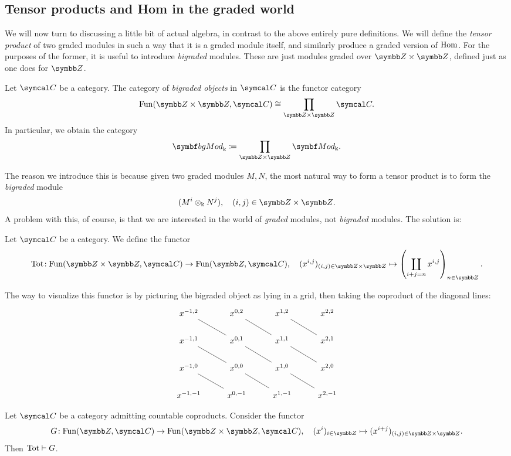 \subsection{Tensor products and Hom in the graded world}
We will now turn to discussing a little bit of actual algebra, in contrast to the above entirely pure definitions. We will define the \emph{tensor product}
of two graded modules in such a way that it is a graded module itself, and similarly produce a graded version of \(\operatorname{Hom}\). For the purposes of the former,
it is useful to introduce \emph{bigraded} modules. These are just modules graded over \(\Z\times\Z\), defined just as one does for \(\Z\).
\begin{definition}
	Let \(\calC\) be a category. The category of \emph{bigraded objects} in \(\calC\) is the functor category
	\[ \Fun(\Z\times\Z,\calC) \cong \prod_{\Z\times\Z}\calC. \]
	In particular, we obtain the category
	\[ \bgMod_{\Bbbk} \coloneq \prod_{\Z\times\Z}\Mod_{\Bbbk}. \]
\end{definition}
The reason we introduce this is because given two graded modules \(M,N\), the most natural way to form a tensor product is to form the
\emph{bigraded} module
\[ (M^i\otimes_\Bbbk N^j), \quad {(i,j)\in\Z\times\Z}. \]
A problem with this, of course, is that we are interested in the world of \emph{graded} modules, not \emph{bigraded} modules. The solution is:
\begin{definition}
	Let \(\calC\) be a category. We define the functor
	\[ \Tot\!:\Fun(\Z\times\Z,\calC)\to\Fun(\Z,\calC),\quad (x^{i,j})_{(i,j)\in\Z\times\Z} \mapsto \left(\coprod_{i+j=n}x^{i,j}\right)_{n\in\Z}.  \]
\end{definition}
The way to visualize this functor is by picturing the bigraded object as lying in a grid, then taking the coproduct of the diagonal lines:
\[
	\begin{tikzcd}
		x^{-1,2}\ar[dr,no head] & x^{0,2}\ar[dr,no head] & x^{1,2}\ar[dr,no head] & x^{2,2} \\
		x^{-1,1}\ar[dr,no head] & x^{0,1}\ar[dr,no head] & x^{1,1}\ar[dr,no head] & x^{2,1} \\
		x^{-1,0}\ar[dr,no head] & x^{0,0}\ar[dr,no head] & x^{1,0}\ar[dr,no head] & x^{2,0} \\
		x^{-1,-1} & x^{0,-1} & x^{1,-1} & x^{2,-1}
	\end{tikzcd}
\]
\begin{proposition}\label{prop:graded-Tot-adjunction}
	Let \(\calC\) be a category admitting countable coproducts. Consider the functor
	\[ G\!: \Fun(\Z,\calC) \to \Fun(\Z\times\Z,\calC),\quad (x^i)_{i\in\Z} \mapsto (x^{i+j})_{(i,j)\in\Z\times\Z}. \]
	Then \(\operatorname{Tot}\vdash G\).
\end{proposition}
